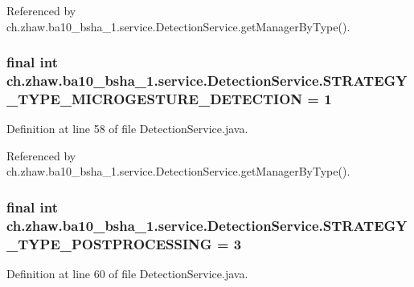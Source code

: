 Referenced by ch.zhaw.ba10\_\-bsha\_\-1.service.DetectionService.getManagerByType().\hypertarget{classch_1_1zhaw_1_1ba10__bsha__1_1_1service_1_1DetectionService_acc8c85d6fe896611e64180360f6150b3}{
\subsubsection[{STRATEGY\_\-TYPE\_\-MICROGESTURE\_\-DETECTION}]{\setlength{\rightskip}{0pt plus 5cm}final int {\bf ch.zhaw.ba10\_\-bsha\_\-1.service.DetectionService.STRATEGY\_\-TYPE\_\-MICROGESTURE\_\-DETECTION} = 1}}
\label{classch_1_1zhaw_1_1ba10__bsha__1_1_1service_1_1DetectionService_acc8c85d6fe896611e64180360f6150b3}


Definition at line 58 of file DetectionService.java.

Referenced by ch.zhaw.ba10\_\-bsha\_\-1.service.DetectionService.getManagerByType().\hypertarget{classch_1_1zhaw_1_1ba10__bsha__1_1_1service_1_1DetectionService_a0a5532caf09d48e950372c1b0de3e328}{
\subsubsection[{STRATEGY\_\-TYPE\_\-POSTPROCESSING}]{\setlength{\rightskip}{0pt plus 5cm}final int {\bf ch.zhaw.ba10\_\-bsha\_\-1.service.DetectionService.STRATEGY\_\-TYPE\_\-POSTPROCESSING} = 3}}
\label{classch_1_1zhaw_1_1ba10__bsha__1_1_1service_1_1DetectionService_a0a5532caf09d48e950372c1b0de3e328}


Definition at line 60 of file DetectionService.java.

